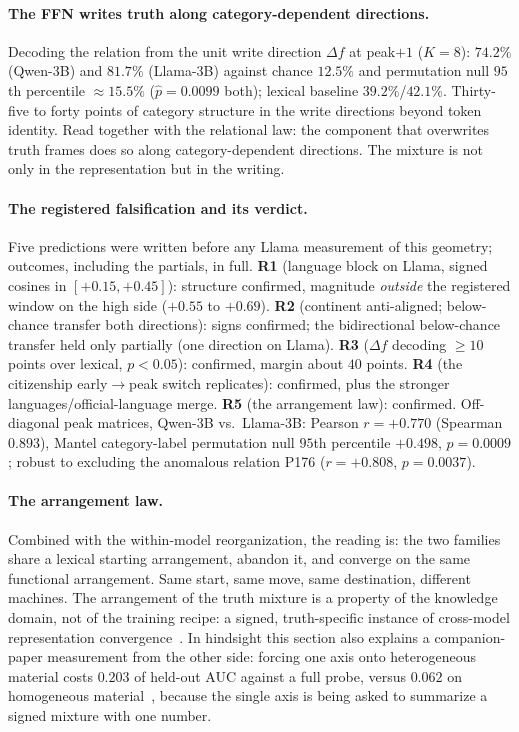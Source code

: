 \documentclass[11pt]{article}
\begin{document}
\paragraph{The FFN writes truth along category-dependent directions.}
Decoding the relation from the unit write direction $\Delta f$ at peak$+1$
($K{=}8$): $74.2\%$ (Qwen-3B) and $81.7\%$ (Llama-3B) against chance
$12.5\%$ and permutation null $95$th percentile $\approx 15.5\%$
($\hat{p} = 0.0099$ both); lexical baseline $39.2\%$/$42.1\%$. Thirty-five
to forty points of category structure in the write directions beyond token
identity. Read together with the relational law: the component that
overwrites truth frames does so along category-dependent directions. The
mixture is not only in the representation but in the writing.

\paragraph{The registered falsification and its verdict.} Five predictions
were written before any Llama measurement of this geometry; outcomes,
including the partials, in full. \textbf{R1} (language block on Llama,
signed cosines in $[+0.15, +0.45]$): structure confirmed, magnitude
\emph{outside} the registered window on the high side ($+0.55$ to $+0.69$).
\textbf{R2} (continent anti-aligned; below-chance transfer both
directions): signs confirmed; the bidirectional below-chance transfer held
only partially (one direction on Llama). \textbf{R3} ($\Delta f$ decoding
$\geq 10$ points over lexical, $p < 0.05$): confirmed, margin about $40$
points. \textbf{R4} (the citizenship early$\to$peak switch replicates):
confirmed, plus the stronger languages/official-language merge.
\textbf{R5} (the arrangement law): confirmed. Off-diagonal peak matrices,
Qwen-3B vs.\ Llama-3B: Pearson $r = +0.770$ (Spearman $0.893$), Mantel
category-label permutation null $95$th percentile $+0.498$, $p = 0.0009$;
robust to excluding the anomalous relation P176 ($r = +0.808$,
$p = 0.0037$).

\paragraph{The arrangement law.} Combined with the within-model
reorganization, the reading is: the two families share a lexical starting
arrangement, abandon it, and converge on the same functional arrangement.
Same start, same move, same destination, different machines. The
arrangement of the truth mixture is a property of the knowledge domain, not
of the training recipe: a signed, truth-specific instance of cross-model
representation convergence~\cite{platonic2024}. In hindsight this section
also explains a companion-paper measurement from the other side: forcing
one axis onto heterogeneous material costs $0.203$ of held-out AUC against
a full probe, versus $0.062$ on homogeneous material~\cite{companion},
because the single axis is being asked to summarize a signed mixture with
one number.
\end{document}
